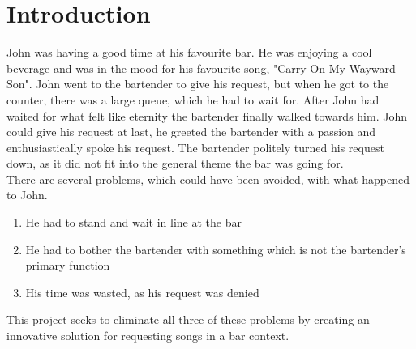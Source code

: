 \chapter{Introduction}
John was having a good time at his favourite bar. He was enjoying a cool beverage and was in the mood for his favourite song, "Carry On My Wayward Son". John went to the bartender to give his request, but when he got to the counter, there was a large queue, which he had to wait for. After John had waited for what felt like eternity the bartender finally walked towards him. John could give his request at last, he greeted the bartender with a passion and enthusiastically spoke his request. The bartender politely turned his request down, as it did not fit into the general theme the bar was going for.\\

There are several problems, which could have been avoided, with what happened to John. 
\begin{enumerate}
	\item He had to stand and wait in line at the bar
	\item He had to bother the bartender with something which is not the bartender's primary function
	\item His time was wasted, as his request was denied
\end{enumerate}
This project seeks to eliminate all three of these problems by creating an innovative solution for requesting songs in a bar context.
